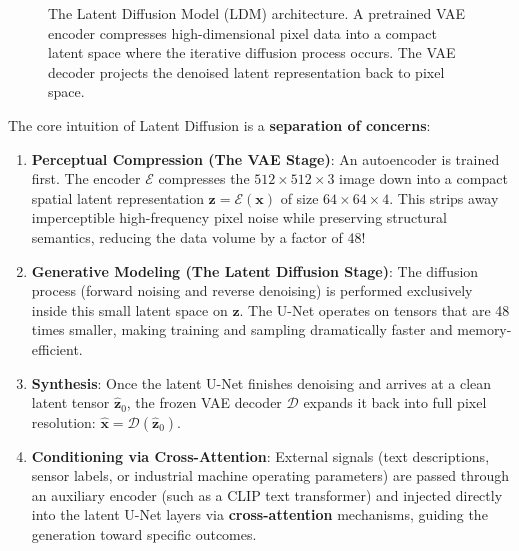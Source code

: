 \begin{figure}[htbp]
\caption{The Latent Diffusion Model (LDM) architecture. A pretrained VAE encoder compresses high-dimensional pixel data into a compact latent space where the iterative diffusion process occurs. The VAE decoder projects the denoised latent representation back to pixel space.}\label{fig:latent_diffusion}
\end{figure}

The core intuition of Latent Diffusion is a \textbf{separation of concerns}:
\begin{enumerate}
    \item \textbf{Perceptual Compression (The VAE Stage)}: An autoencoder is trained first. The encoder $\mathcal{E}$ compresses the $512 \times 512 \times 3$ image down into a compact spatial latent representation $\mathbf{z} = \mathcal{E}(\mathbf{x})$ of size $64 \times 64 \times 4$. This strips away imperceptible high-frequency pixel noise while preserving structural semantics, reducing the data volume by a factor of 48!
    \item \textbf{Generative Modeling (The Latent Diffusion Stage)}: The diffusion process (forward noising and reverse denoising) is performed exclusively inside this small latent space on $\mathbf{z}$. The U-Net operates on tensors that are 48 times smaller, making training and sampling dramatically faster and memory-efficient.
    \item \textbf{Synthesis}: Once the latent U-Net finishes denoising and arrives at a clean latent tensor $\hat{\mathbf{z}}_0$, the frozen VAE decoder $\mathcal{D}$ expands it back into full pixel resolution: $\hat{\mathbf{x}} = \mathcal{D}(\hat{\mathbf{z}}_0)$.
    \item \textbf{Conditioning via Cross-Attention}: External signals (text descriptions, sensor labels, or industrial machine operating parameters) are passed through an auxiliary encoder (such as a CLIP text transformer) and injected directly into the latent U-Net layers via \textbf{cross-attention} mechanisms, guiding the generation toward specific outcomes.
\end{enumerate}

